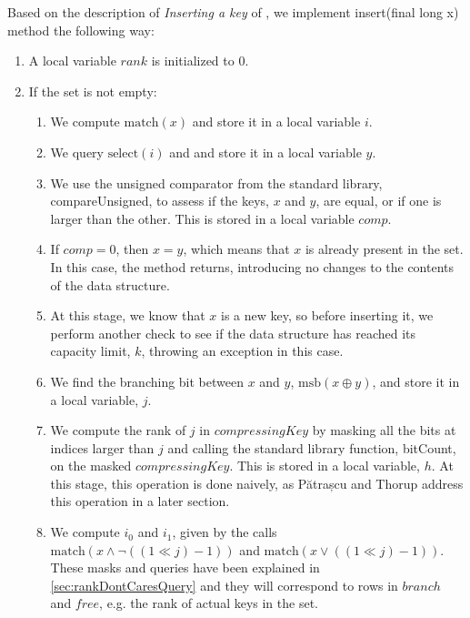 Based on the description of \textit{Inserting a key} of \cite{patrascu2014dynamic}, we implement {\ttfamily insert(final long x)} method the following way:
\begin{enumerate}
    \item
    A local variable $rank$ is initialized to $0$.
    
    \item
    If the set is not empty:
    \begin{enumerate}
        \item \label{blt:matchX}
        We compute $\text{match}(x)$ and store it in a local variable $i$.
        
        \item
        We query $\text{select}(i)$ and and store it in a local variable $y$.
        
        \item
        We use the unsigned comparator from the standard library, {\ttfamily compareUnsigned}, to assess if the keys, $x$ and $y$, are equal, or if one is larger than the other. This is stored in a local variable $comp$.
        
        \item
        If $comp = 0$, then $x = y$, which means that $x$ is already present in the set. In this case, the method returns, introducing no changes to the contents of the data structure.
        
        \item
        At this stage, we know that $x$ is a new key, so before inserting it, we perform another check to see if the data structure has reached its capacity limit, $k$, throwing an exception in this case.
        
        \item
        We find the branching bit between $x$ and $y$, $\text{msb}(x \oplus y)$, and store it in a local variable, $j$.
        
        \item \label{blt:naiveRankJ}
        We compute the rank of $j$ in $compressingKey$ by masking all the bits at indices larger than $j$ and calling the standard library function, {\ttfamily bitCount}, on the masked $compressingKey$. This is stored in a local variable, $h$. At this stage, this operation is done naively, as Pătrașcu and Thorup address this operation in a later section.
        
        \item  \label{blt:matchI_0I_1}
        We compute $i_0$ and $i_1$, given by the calls $\text{match}(x \wedge \neg((1 \ll j) - 1))$ and $\text{match}(x \vee ((1 \ll j) - 1))$. These masks and queries have been explained in \ref{sec:rankDontCaresQuery} and they will correspond to rows in $branch$ and $free$, e.g. the rank of actual keys in the set.
        

\end{enumerate}
\end{enumerate}
